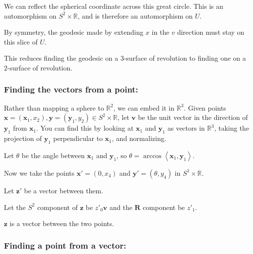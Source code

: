 We can reflect the spherical coordinate across this great circle. This is an automorphism on $S^2 \times \mathbb{R}$, and is therefore an automorphism on $U$.

By symmetry, the geodesic made by extending $x$ in the $v$ direction must stay on this slice of $U$.

This reduces finding the geodesic on a $3$-surface of revolution to finding one on a $2$-surface of revolution.



\bigskip

\subsubsection{Finding the vectors from a point:}

\bigskip

Rather than mapping a sphere to $\mathbb{R}^2$, we can embed it in $\mathbb{R}^3$. Given points $\textbf{x} = (\textbf{x}_1, x_2), \textbf{y} = (\textbf{y}_1, y_2) \in S^2 \times \mathbb{R}$, let $\textbf{v}$ be the unit vector in the direction of $\textbf{y}_1$ from $\textbf{x}_1$. You can find this by looking at $\textbf{x}_1$ and $\textbf{y}_1$ as vectors in $\mathbb{R}^3$, taking the projection of $\textbf{y}_1$ perpendicular to $\textbf{x}_1$, and normalizing.

Let $\theta$ be the angle between $\textbf{x}_1$ and $\textbf{y}_1$, so $\theta = \arccos\left<\textbf{x}_1,\textbf{y}_1\right>$.

Now we take the points $\textbf{x}' = (0,x_4)$ and $\textbf{y}' = (\theta, y_4)$ in $S^1 \times \mathbb{R}$.

Let $\textbf{z}'$ be a vector between them.

Let the $S^2$ component of $\textbf{z}$ be $z'_0\textbf{v}$ and the $\textbf{R}$ component be $z'_1$.

$\textbf{z}$ is a vector between the two points.

\bigskip

\subsubsection{Finding a point from a vector:}

